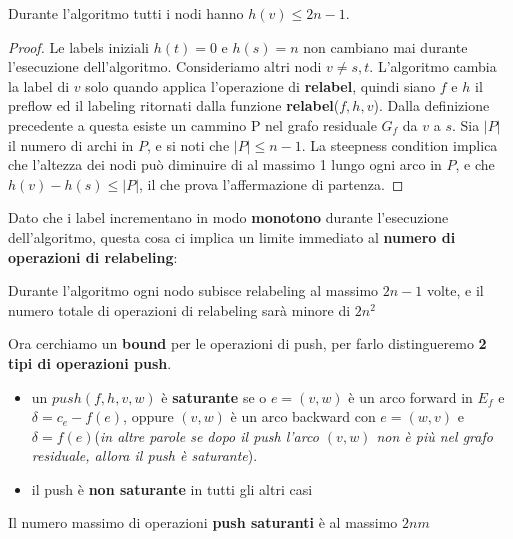\begin{myblockquote}
      Durante l'algoritmo tutti i nodi hanno $h(v) \le 2n-1$.
\end{myblockquote}

\begin{proof}
      Le labels iniziali $h(t) = 0$ e $h(s) = n$ non cambiano mai
      durante l'esecuzione dell'algoritmo. Consideriamo altri nodi $v \neq s, t$.
      L'algoritmo cambia la label di $v$ solo quando applica l'operazione di
      \textbf{relabel}, quindi siano $f$ e $h$ il preflow ed il labeling ritornati
      dalla funzione \textbf{relabel}($f , h, v$). Dalla definizione precedente a
      questa esiste un cammino P nel grafo residuale $G_f$ da $v$ a $s$. Sia $|P|$ il
      numero di archi in $P$, e si noti che $|P| \leq n - 1$. La steepness condition
      implica che l'altezza dei nodi può diminuire di al massimo 1 lungo ogni arco in
      $P$, e che $h(v) - h(s) \leq |P|$, il che prova l'affermazione di partenza.
\end{proof}

Dato che i label incrementano in modo \textbf{monotono} durante l'esecuzione
dell'algoritmo, questa cosa ci implica un limite immediato al \textbf{numero di
      operazioni di relabeling}:

\begin{myblockquote}
      Durante l'algoritmo ogni nodo subisce relabeling al massimo $2n-1$ volte, e
      il numero totale di operazioni di relabeling sarà minore di $2n^2$
\end{myblockquote}

Ora cerchiamo un \textbf{bound} per le operazioni di push, per farlo
distingueremo \textbf{2 tipi di operazioni push}.
\begin{itemize}
      \item un $push(f, h, v, w)$ è \textbf{saturante} se o $e = (v, w)$ è un arco
            forward in $E_f$ e $\delta = c_e - f(e)$, oppure $(v,w)$ è un arco backward
            con $e = (w,v)$ e $\delta = f(e)$(\textit{in altre parole se dopo il push
                  l'arco $(v,w)$ non è più nel grafo residuale, allora il push è saturante}).
      \item il push è \textbf{non saturante} in tutti gli altri casi
\end{itemize}

\begin{myblockquote}
      Il numero massimo di operazioni \textbf{push saturanti} è al massimo $2nm$
\end{myblockquote}

